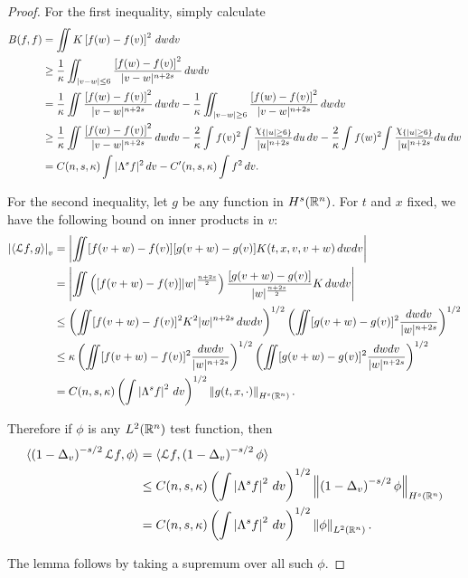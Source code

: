 \begin{proof}
For the first inequality, simply calculate
\begin{align*}
B(f, f) &= \iint K \left[ f(w) - f(v) \right]^2 \,dwdv
\\ &\geq \frac{1}{\kappa} \iint_{|v-w| \leq 6}  \frac{\left[ f(w) - f(v) \right]^2}{|v-w|^{n+2s}} \,dwdv
\\ &= \frac{1}{\kappa} \iint \frac{\left[ f(w) - f(v) \right]^2}{|v-w|^{n+2s}} \,dwdv - \frac{1}{\kappa} \iint_{|v-w| \geq 6}  \frac{\left[ f(w) - f(v) \right]^2}{|v-w|^{n+2s}} \,dwdv
\\ &\geq \frac{1}{\kappa} \iint \frac{\left[ f(w) - f(v) \right]^2}{|v-w|^{n+2s}} \,dwdv - \frac{2}{\kappa} \int f(v)^2 {\int  \frac{\chi_{\{|u|\geq 6\}}}{|u|^{n+2s}} du} \,dv - \frac{2}{\kappa} \int f(w)^2 {\int \frac{\chi_{\{|u|\geq 6\}}}{|u|^{n+2s}} du} \,dw
\\ &	= C(n,s,\kappa) \int |\Lambda^s f|^2 \, dv - C'(n,s,\kappa) \int f^2 \,dv.
\end{align*}

For the second inequality, let $g$ be any function in $H^s(\mathbb{R}^n)$.  For $t$ and $x$ fixed, we have the following bound on inner products in $v$:
\begin{align*}
\left\lvert \langle \mathcal{L} f, g \rangle \right\rvert_v &= \left\lvert \iint [f(v+w)-f(v)][g(v+w) - g(v)] K(t,x,v,v+w) \,dwdv \right\rvert
\\ &= \left\lvert \iint \left( [f(v+w)-f(v)]|w|^{\frac{n+2s}{2}} \right)\frac{[g(v+w) - g(v)]}{|w|^{\frac{n+2s}{2}}} K \,dwdv \right\rvert
\\ &\leq \left( \iint [f(v+w)-f(v)]^2 K^2 |w|^{n+2s} \,dwdv \right)^{1/2} \left( \iint [g(v+w) - g(v)]^{2} \frac{dwdv}{|w|^{n+2s}} \right)^{1/2}
\\ &\leq \kappa \left( \iint [f(v+w)-f(v)]^2 \frac{dwdv}{|w|^{n+2s}} \right)^{1/2} \left( \iint [g(v+w) - g(v)]^{2} \frac{dwdv}{|w|^{n+2s}} \right)^{1/2}
\\ &= C(n,s,\kappa) \left( \int \left\lvert \Lambda^s f \right\rvert^2 \,dv \right)^{1/2} \left\lVert g(t,x,\cdot)\right\rVert_{H^s(\mathbb{R}^n)}.
\end{align*}

Therefore if $\phi$ is any $L^{2}(\mathbb{R}^n)$ test function, then
\begin{align*}
\langle \left( 1-\Delta_v \right)^{-s/2}\mathcal{L} f,\phi \rangle &= \langle \mathcal{L} f,\left( 1-\Delta_v \right)^{-s/2}\phi \rangle
\\ &\leq C(n,s,\kappa) \left( \int \left\lvert \Lambda^s f \right\rvert^2 \,dv \right)^{1/2}  \left\lVert\left( 1-\Delta_v \right)^{-s/2}\phi\right\rVert_{H^s(\mathbb{R}^n)}
\\ &= C(n,s,\kappa) \left( \int \left\lvert \Lambda^s f \right\rvert^2 \,dv \right)^{1/2} \left\lVert\phi\right\rVert_{L^2(\mathbb{R}^n)}.
\end{align*}

The lemma follows by taking a supremum over all such $\phi$.  

\end{proof}

